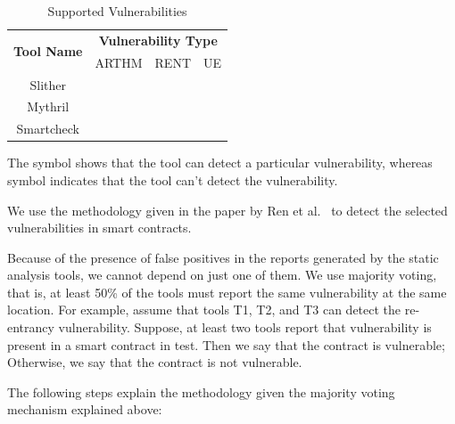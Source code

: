	\begin{table}[t]
		\caption{Supported Vulnerabilities}
		\label{tab:freq}
		\begin{tabular}{cccc}
	  
	  \multirow{2}{*}{\textbf{Tool Name}} & \multicolumn{3}{c}{\textbf{Vulnerability Type}} \\
		 & ARTHM & RENT & UE \\ \midrule
		  Slither    & \crossmark  &  \checkmark  &  \checkmark  \\
		  Mythril    & \checkmark  &  \checkmark  &  \checkmark  \\
		  Smartcheck & \checkmark  &  \crossmark  &  \checkmark  \\
		  \bottomrule
	  \end{tabular}
	  \label{table:vuln_supported_per_tool}
	  \end{table}
	
	
	The \checkmark symbol shows that the tool can detect a particular vulnerability, whereas symbol \crossmark indicates that the tool can't detect the vulnerability.
	
	We use the methodology given in the paper by Ren et al.~\cite{Making-Smart-Contract-Development-More-Secure-and-Easier} to detect the selected vulnerabilities in smart contracts.
	
	Because of the presence of false positives in the reports generated by the static analysis tools, we cannot depend on just one of them.
	We use majority voting, that is, at least 50\% of the tools must report the same vulnerability at the same location.
	For example, assume that tools T1, T2, and T3 can detect the re-entrancy vulnerability.
	Suppose, at least two tools report that vulnerability is present in a smart contract in test.
	Then we say that the contract is vulnerable;
	Otherwise, we say that the contract is not vulnerable.
	
	The following steps explain the methodology given the majority voting mechanism explained above:
	
